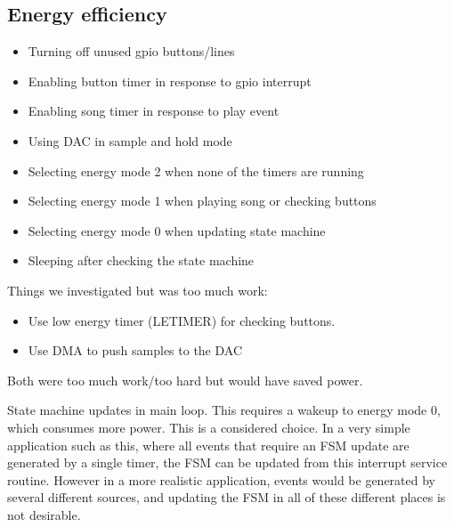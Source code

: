 \subsection{Energy efficiency}

\begin{itemize}
  \item Turning off unused gpio buttons/lines
  \item Enabling button timer in response to gpio interrupt
  \item Enabling song timer in response to play event
  \item Using DAC in sample and hold mode
  \item Selecting energy mode 2 when none of the timers are running
  \item Selecting energy mode 1 when playing song or checking buttons
  \item Selecting energy mode 0 when updating state machine
  \item Sleeping after checking the state machine
\end{itemize}

Things we investigated but was too much work:

\begin{itemize}
  \item Use low energy timer (LETIMER) for checking buttons.
  \item Use DMA to push samples to the DAC
\end{itemize}

Both were too much work/too hard but would have saved power.

State machine updates in main loop. This requires a wakeup to energy mode 0, which consumes more power.
This is a considered choice. In a very simple application such as this, where all events that require an
FSM update are generated by a single timer, the FSM can be updated from this interrupt service routine.
However in a more realistic application, events would be generated by several different sources, and
updating the FSM in all of these different places is not desirable.
